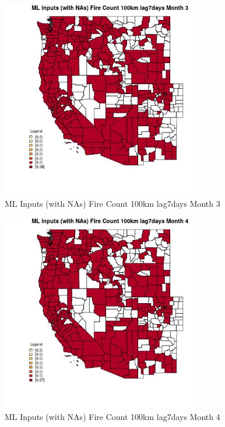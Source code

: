 \begin{figure} 
\centering  
\includegraphics[width=0.77\textwidth]{Code_Outputs/Report_ML_input_PM25_Step4_part_e_de_duplicated_aves_compiled_2019-05-21wNAs_CountyFire_Count_100km_lag7daysmedianMonth3.jpg} 
\caption{\label{fig:Report_ML_input_PM25_Step4_part_e_de_duplicated_aves_compiled_2019-05-21wNAsCountyFire_Count_100km_lag7daysmedianMonth3}ML Inputs (with NAs) Fire Count 100km lag7days Month 3} 
\end{figure} 
 

\begin{figure} 
\centering  
\includegraphics[width=0.77\textwidth]{Code_Outputs/Report_ML_input_PM25_Step4_part_e_de_duplicated_aves_compiled_2019-05-21wNAs_CountyFire_Count_100km_lag7daysmedianMonth4.jpg} 
\caption{\label{fig:Report_ML_input_PM25_Step4_part_e_de_duplicated_aves_compiled_2019-05-21wNAsCountyFire_Count_100km_lag7daysmedianMonth4}ML Inputs (with NAs) Fire Count 100km lag7days Month 4} 
\end{figure} 
 

